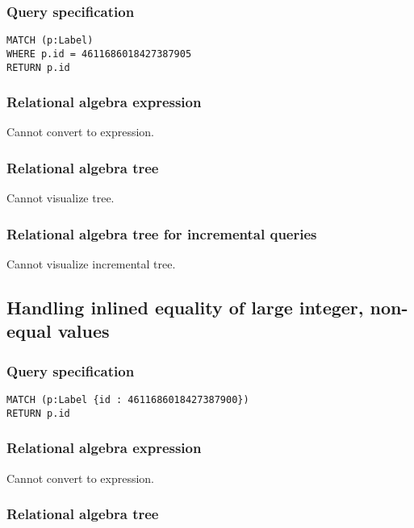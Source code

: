 \subsubsection*{Query specification}

\begin{lstlisting}
MATCH (p:Label)
WHERE p.id = 4611686018427387905
RETURN p.id
\end{lstlisting}

\subsubsection*{Relational algebra expression}

Cannot convert to expression.

\subsubsection*{Relational algebra tree}

Cannot visualize tree.

\subsubsection*{Relational algebra tree for incremental queries}

Cannot visualize incremental tree.

\subsection{Handling inlined equality of large integer, non-equal values}

\subsubsection*{Query specification}

\begin{lstlisting}
MATCH (p:Label {id : 4611686018427387900})
RETURN p.id
\end{lstlisting}

\subsubsection*{Relational algebra expression}

Cannot convert to expression.

\subsubsection*{Relational algebra tree}

